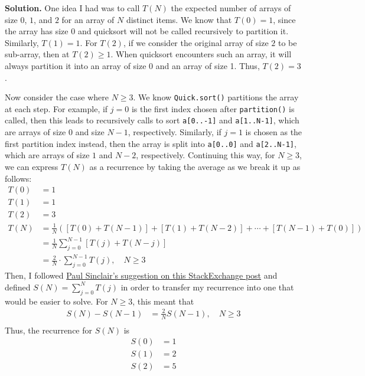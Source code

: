 \documentclass[12pt, a4paper]{article}
\newenvironment{sol}[1][Solution]
{\par\medskip\noindent \textbf{#1.} }
{\medskip}
\begin{document}
	\begin{sol}
		One idea I had was to call $T(N)$ the expected number of arrays of size
		$0$, $1$, and $2$ for an array of $N$ distinct items. We know that
		$T(0)=1$, since the array has size $0$ and quicksort will not be
		called recursively to partition it. Similarly, $T(1)=1$. For
		$T(2)$, if we consider the original array of size $2$ to be sub-array,
		then at $T(2)\geq 1$. When quicksort encounters such an array,
		it will always partition it into an array of size 0 and an array of size 1.
		Thus, $T(2)=3$.
		
		Now consider the case where $N\geq 3$. We know \texttt{Quick.sort()}
		partitions the array at each step. For example, if $j=0$ is the first
		index chosen after \texttt{partition()} is called, then this leads to
		recursively calls to sort \texttt{a[0..-1]} and \texttt{a[1..N-1]}, which
		are arrays of size 0 and size $N-1$, respectively. Similarly, if $j=1$
		is chosen as the first partition index instead, then the array is
		split into \texttt{a[0..0]} and \texttt{a[2..N-1]}, which are arrays
		of size $1$ and $N-2$, respectively. Continuing this way, for $N\geq 3$, we
		can express $T(N)$ as a recurrence by taking the average as we break it up as follows:
		\begin{align*}
			T(0)&=1\\
			T(1)&=1\\
			T(2)&=3\\
			T(N)&= \frac{1}{N}\left([T(0) + T(N-1)] + [T(1) + T(N-2)] + \cdots+[T(N-1) + T(0)]\right)\\
			&=\frac{1}{N}\sum_{j=0}^{N-1}[T(j)+T(N-j)]\\
			&=\frac{2}{N}\cdot \sum_{j=0}^{N-1}T(j),\quad N\geq 3
		\end{align*}
		Then, I followed \href{https://math.stackexchange.com/questions/2116763/recurrence-relation-with-summation-of-previous-terms}{Paul Sinclair's suggestion on this StackExchange post}
		and defined $S(N)=\sum_{j=0}^{N}T(j)$ in order to transfer my recurrence
		into one that would be easier to solve. For $N\geq 3$, this meant that
		\begin{align*}
			S(N)-S(N-1)&=\frac{2}{N}S(N-1),\quad N\geq 3\\
		\end{align*}
		Thus, the recurrence for $S(N)$ is
		\begin{align*}
			S(0) &= 1\\
			S(1) &= 2\\
			S(2) &= 5\\

\end{align*}
\end{sol}
\end{document}
